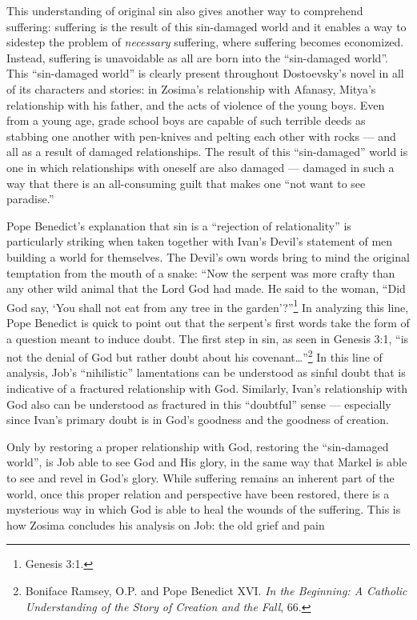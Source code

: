 This understanding of original sin also gives another way to comprehend suffering: suffering is the result of this sin-damaged world and it enables a way to sidestep the problem of \emph{necessary} suffering, where suffering becomes economized. Instead, suffering is unavoidable as all are born into the ``sin-damaged world''. This ``sin-damaged world'' is clearly present throughout Dostoevsky's novel in all of its characters and stories: in Zosima's relationship with Afanasy, Mitya's relationship with his father, and the acts of violence of the young boys. Even from a young age, grade school boys are capable of such terrible deeds as stabbing one another with pen-knives and pelting each other with rocks --- and all as a result of damaged relationships. The result of this ``sin-damaged'' world is one in which relationships with oneself are also damaged --- damaged in such a way that there is an all-consuming guilt that makes one ``not want to see paradise.''

Pope Benedict's explanation that sin is a ``rejection of relationality'' is particularly striking when taken together with Ivan's Devil's statement of men building a world for themselves. The Devil's own words bring to mind the original temptation from the mouth of a snake: ``Now the serpent was more crafty than any other wild animal that the Lord God had made. He said to the woman, ``Did God say, `You shall not eat from any tree in the garden'?''\footnote{Genesis 3:1.} In analyzing this line, Pope Benedict is quick to point out that the serpent's first words take the form of a question meant to induce doubt. The first step in sin, as seen in Genesis 3:1, ``is not the denial of God but rather doubt about his covenant\ldots''\footnote{Boniface Ramsey, O.P. and Pope Benedict XVI. \emph{In the Beginning: A Catholic Understanding of the Story of Creation and the Fall}, 66.} In this line of analysis, Job's ``nihilistic'' lamentations can be understood as sinful doubt that is indicative of a fractured relationship with God. Similarly, Ivan's relationship with God also can be understood as fractured in this ``doubtful'' sense --- especially since Ivan's primary doubt is in God's goodness and the goodness of creation. 

Only by restoring a proper relationship with God, restoring the ``sin-damaged world'', is Job able to see God and His glory, in the same way that Markel is able to see and revel in God's glory. While suffering remains an inherent part of the world, once this proper relation and perspective have been restored, there is a mysterious way in which God is able to heal the wounds of the suffering. This is how Zosima concludes his analysis on Job: the old grief and pain 

